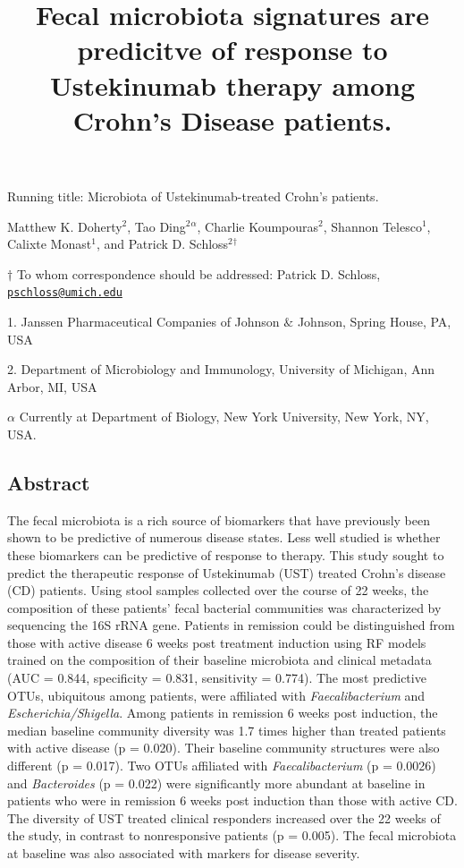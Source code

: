 \documentclass[12pt,]{article}
\title{Fecal microbiota signatures are predicitve of response to Ustekinumab
therapy among Crohn's Disease patients.}
\author{}
\date{}
\begin{document}
\maketitle

\vspace{35mm}

Running title: Microbiota of Ustekinumab-treated Crohn's patients.

\vspace{35mm} Matthew K. Doherty\({^2}\), Tao Ding\({^2}\)\({^\alpha}\),
Charlie Koumpouras\({^2}\), Shannon Telesco\({^1}\), Calixte
Monast\({^1}\), and Patrick D. Schloss\({^2}\)\({^\dagger}\)

\(\dagger\) To whom correspondence should be addressed: Patrick D.
Schloss,
\href{mailto:pschloss@umich.edu}{\nolinkurl{pschloss@umich.edu}}

1. Janssen Pharmaceutical Companies of Johnson \({\&}\) Johnson, Spring
House, PA, USA

2. Department of Microbiology and Immunology, University of Michigan,
Ann Arbor, MI, USA

\({\alpha}\) Currently at Department of Biology, New York University,
New York, NY, USA.

\newpage

\subsection{Abstract}\label{abstract}

The fecal microbiota is a rich source of biomarkers that have previously
been shown to be predictive of numerous disease states. Less well
studied is whether these biomarkers can be predictive of response to
therapy. This study sought to predict the therapeutic response of
Ustekinumab (UST) treated Crohn's disease (CD) patients. Using stool
samples collected over the course of 22 weeks, the composition of these
patients' fecal bacterial communities was characterized by sequencing
the 16S rRNA gene. Patients in remission could be distinguished from
those with active disease 6 weeks post treatment induction using RF
models trained on the composition of their baseline microbiota and
clinical metadata (AUC = 0.844, specificity = 0.831, sensitivity =
0.774). The most predictive OTUs, ubiquitous among patients, were
affiliated with \emph{Faecalibacterium} and \emph{Escherichia/Shigella}.
Among patients in remission 6 weeks post induction, the median baseline
community diversity was 1.7 times higher than treated patients with
active disease (p = 0.020). Their baseline community structures were
also different (p = 0.017). Two OTUs affiliated with
\emph{Faecalibacterium} (p = 0.0026) and \emph{Bacteroides} (p = 0.022)
were significantly more abundant at baseline in patients who were in
remission 6 weeks post induction than those with active CD. The
diversity of UST treated clinical responders increased over the 22 weeks
of the study, in contrast to nonresponsive patients (p = 0.005). The
fecal microbiota at baseline was also associated with markers for
disease severity.
\end{document}
